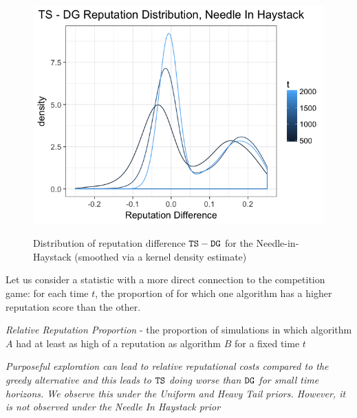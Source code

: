 \documentclass[../competing_bandits.tex]{subfiles}
\begin{document}
{\begin{figure}[H]
\caption{Distribution of reputation difference $\mathtt{TS}-\mathtt{DG}$ for the Needle-in-Haystack (smoothed via a kernel density estimate)}
\includegraphics[scale=0.35]{figures/ts_dg_rep_diff_nih}
\label{ts_dg_rep_diff_nih}
\end{figure}

Let us consider a statistic with a more direct connection to the competition game: for each time $t$, the proportion of \MRVs for which one algorithm has a higher reputation score than the other. 


\begin{definition}
\textit{Relative Reputation Proportion} - the proportion of simulations in which algorithm $A$ had at least as high of a reputation as algorithm $B$ for a fixed time $t$
\end{definition}


\begin{finding}
\textit{Purposeful exploration can lead to relative reputational costs compared to the greedy alternative and this leads to $\mathtt{TS}$ doing worse than $\mathtt{DG}$ for small time horizons. We observe this under the Uniform and Heavy Tail priors. However, it is not observed under the Needle In Haystack prior}
\end{finding}

}
\end{document}
